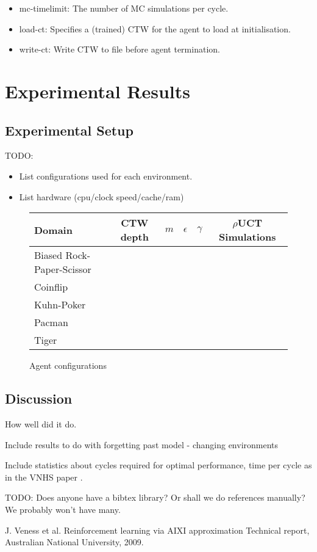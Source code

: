 \documentclass{article}
\begin{document}
\begin{itemize}
    \item mc-timelimit: The number of MC simulations per cycle.
    \item load-ct: Specifies a (trained) CTW for the agent to load at initialisation.
    \item write-ct: Write CTW to file before agent termination.
\end{itemize}


\section{Experimental Results}
\subsection{Experimental Setup}
TODO:
\begin{itemize}
    \item List configurations used for each environment.
    \item List hardware (cpu/clock speed/cache/ram)
\end{itemize}

\begin{figure}[tb]
\centering
\begin{tabular}{l|c|c|c|c|c}
Domain & CTW depth & $m$ & $\epsilon$ & $\gamma$ & $\rho$UCT Simulations\\\hline
Biased Rock-Paper-Scissor & \\
Coinflip & \\
Kuhn-Poker & \\
Pacman & \\
Tiger & \\
\end{tabular}
\caption{\label{tab:setup}Agent configurations}
\end{figure}

\subsection{Discussion}
How well did it do.

Include results to do with forgetting past model - changing environments

Include statistics about cycles required for optimal performance, time per cycle as in the VNHS paper \cite{VNHS09}.

TODO: Does anyone have a bibtex library? Or shall we do references manually? We probably won't have many.
\begin{thebibliography}{1}

J. Veness et al.
\newblock Reinforcement learning via AIXI approximation
\newblock Technical report, Australian National University, 2009.

\end{thebibliography}
\end{document}
